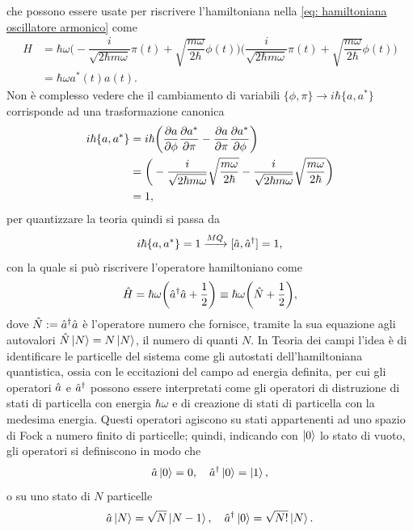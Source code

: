 che possono essere usate per riscrivere l'hamiltoniana nella \eqref{eq: hamiltoniana oscillatore armonico} come
\begin{equation}
    \begin{split}
        H &= \hbar\omega\bigg(-\dfrac{i}{\sqrt{2\hbar m\omega}}\pi(t) + \sqrt{\dfrac{m\omega}{2\hbar}}\phi(t)\bigg)\bigg(\dfrac{i}{\sqrt{2\hbar m\omega}}\pi(t) + \sqrt{\dfrac{m\omega}{2\hbar}}\phi(t)\bigg) \\
        &= \hbar\omega a^*(t)a(t).
    \end{split}
\end{equation}
Non è complesso vedere che il cambiamento di variabili $\{\phi,\pi\} \to i\hbar\{a,a^*\}$ corrisponde ad una trasformazione canonica
\begin{equation}
    \begin{split}
        i\hbar\{a,a^*\} &= i\hbar\bigg(\frac{\partial a}{\partial \phi}\frac{\partial a^*}{\partial \pi} - \frac{\partial a}{\partial \pi}\frac{\partial a^*}{\partial \phi}\bigg) \\
        &= \bigg(-\dfrac{i}{\sqrt{2\hbar m\omega}}\sqrt{\dfrac{m\omega}{2\hbar}} -\dfrac{i}{\sqrt{2\hbar m\omega}}\sqrt{\dfrac{m\omega}{2\hbar}}\bigg) \\
        &= 1,
    \end{split}
\end{equation}
per quantizzare la teoria quindi si passa da
\begin{equation}
    i\hbar\{a,a^*\} = 1 \xrightarrow{MQ} [\hat{a},\hat{a}^\dagger] = 1,
\end{equation}
con la quale si può riscrivere l'operatore hamiltoniano come
\begin{equation}
    \hat{H} = \hbar\omega\bigg(\hat{a}^\dagger\hat{a} + \frac{1}{2}\bigg) \equiv \hbar\omega\bigg(\hat{N} + \frac{1}{2}\bigg),
\end{equation}
dove $\hat{N} := \hat{a}^\dagger\hat{a}$ è l'operatore numero che fornisce, tramite la sua equazione agli autovalori $\hat{N}\ket{N} = N\ket{N}$, il numero di quanti $N$. In Teoria dei campi l'idea è di identificare le particelle del sistema come gli autostati dell'hamiltoniana quantistica, ossia con le eccitazioni del campo ad energia definita, per cui gli operatori $\hat{a}$ e $\hat{a}^\dagger$ possono essere interpretati come gli operatori di distruzione di stati di particella con energia $\hbar\omega$ e di creazione di stati di particella con la medesima energia. Questi operatori agiscono su stati appartenenti ad uno spazio di Fock a numero finito di particelle; quindi, indicando con $\ket{0}$ lo stato di vuoto, gli operatori si definiscono in modo che 
\begin{equation}
    \hat{a}\ket{0} = 0,\quad \hat{a}^\dagger\ket{0} = \ket{1},
\end{equation}
o su uno stato di $N$ particelle
\begin{equation}
    \hat{a}\ket{N} = \sqrt{N}\ket{N - 1},\quad \hat{a}^\dagger\ket{0} = \sqrt{N!}\ket{N}.
\end{equation}

